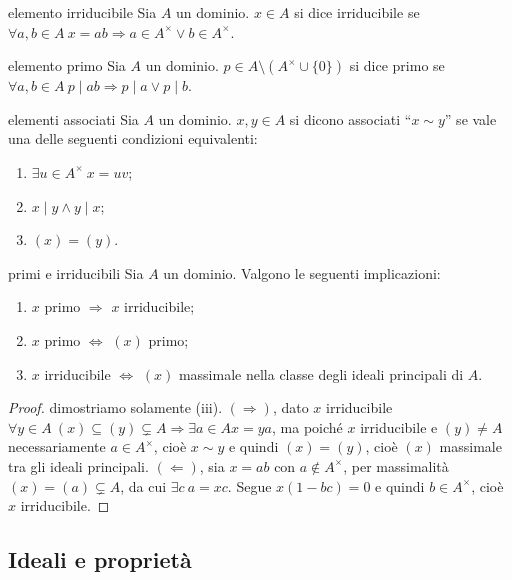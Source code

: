 \begin{definition}{elemento irriducibile}
    Sia $A$ un dominio. $x \in A$ si dice irriducibile se $\forall a, b \in A \ x = ab \Rightarrow a \in A^\times \lor b \in A^\times$.
\end{definition}
\begin{definition}{elemento primo}
    Sia $A$ un dominio. $p \in A \setminus (A^\times \cup \{ 0 \})$ si dice primo se $\forall a, b \in A \ p \mid ab \Rightarrow p \mid a \lor p \mid b$.
\end{definition}
\begin{definition}{elementi associati}
    Sia $A$ un dominio. $x,y \in A$ si dicono associati ``$x \sim y$'' se vale una delle seguenti condizioni equivalenti:
    \begin{enumerate}[label=(\roman*)]
        \item $\exists u \in A^\times \ x = uv$;
        \item $x \mid y \land y \mid x$;
        \item $(x) = (y)$.
    \end{enumerate}
\end{definition}
\begin{proposition}{primi e irriducibili}
    Sia $A$ un dominio. Valgono le seguenti implicazioni:
    \begin{enumerate}[label=(\roman*)]
        \item $x$ primo $\Rightarrow$ $x$ irriducibile;
        \item $x$ primo $\Leftrightarrow$ $(x)$ primo;
        \item $x$ irriducibile $\Leftrightarrow$ $(x)$ massimale nella classe degli ideali principali di $A$.
    \end{enumerate}
\end{proposition}
\begin{proof}
    dimostriamo solamente (iii). $(\Rightarrow)$, dato $x$ irriducibile $\forall y \in A \ (x) \subseteq (y) \subsetneq A \Rightarrow \exists a \in A x = ya$, ma poiché $x$ irriducibile e $(y) \neq A$ necessariamente $a \in A^\times$, cioè $x \sim y$ e quindi $(x) = (y)$, cioè $(x)$ massimale tra gli ideali principali. $(\Leftarrow)$, sia $x = ab$ con $a \notin A^\times$, per massimalità $(x) = (a) \subsetneq A$, da cui $\exists c \ a = xc$. Segue $x(1 - bc) = 0$ e quindi $b \in A^\times$, cioè $x$ irriducibile.
\end{proof}

\subsection{Ideali e proprietà}

